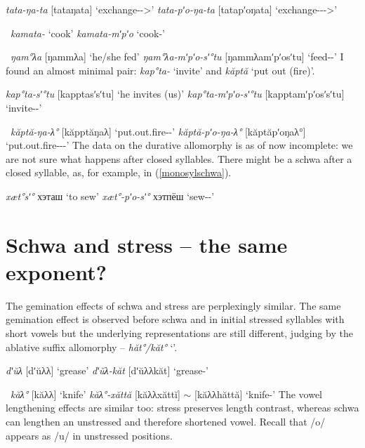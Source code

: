 \documentclass[a4paper, 12pt]{article}
\begin{document}
	\pex\label{even}\a \emph{tata-ŋa-ta} [tataŋata] \hfill `exchange-{\Gfs}-{\Tsg}>{\Pl}'		
		\a \emph{tata-pʹo-ŋa-ta} [tatapʹoŋata] \hfill `exchange-{\Gfs}-{\Dur}-{\Tsg}>{\Pl}'
	\xe	
	
	\pex~\label{odd}\a \emph{kamata-} \hfill `cook'		
		\a \emph{kamata-mʹpʹo} \hfill `cook-{\Dur}' \\		
	\xe	

	\pex~\label{schwaodd}\a \emph{ŋam°λa} [ŋammλa] \hfill `he/she fed'		
		\a \emph{ŋam°λa-mʹpʹo-sʹ°tu} [ŋammλamʹpʹosʹtu] \hfill `feed-{\Dur}-{\Hab}'
	\xe
	I found an almost minimal pair: \emph{kap°ta-} `invite' and \emph{kăptă} `put out (fire)'.
	
	\pex\label{}\a \emph{kap°ta-sʹ°tu} [kapptasʹsʹtu] \hfill `he invites (us)'
		\a \emph{kap°ta-mʹpʹo-sʹ°tu} [kapptamʹpʹosʹsʹtu] \hfill `invite-{\Dur}-{\Hab}'
	\xe
	
	\pex~\label{}\a \emph{kăptă-ŋa-λ°} [kăpptăŋaλ] \hfill `put.out.fire-{\Gfs}-{\Tsg}'
		\a\label{}\emph{kăptă-pʹo-ŋa-λ°} [kăptăpʹoŋaλ°] \hfill `put.out.fire-{\Dur}-{\Gfs}-{\Tsg}'
	\xe
	The data on the durative allomorphy is as of now incomplete: we are not sure what happens after closed syllables. There might be a schwa after a closed syllable, as, for example, in (\ref{monosylschwa}).
	
	\pex\label{}\a \emph{xæt°sʹ°} хэташ \hfill `to sew'
		\a \emph{xæt°-pʹo-sʹ°} хэтпёш \hfill `sew-{\Dur}-{\Ptcp}'\\ \hfill \parencite{barmich-vello}
	\xe
	
%		
		\section{Schwa and stress -- the same exponent?}
		
	The gemination effects of schwa and stress are perplexingly similar. The same gemination effect is observed before schwa and in initial stressed syllables with short vowels but the underlying representations are still different, judging by the ablative suffix allomorphy -- \emph{hăt°/kăt°} `{\Abl}'.
	
	\pex\label{}\a \emph{dʹŭλ} [dʹŭλλ] \hfill `grease'
		\a \emph{dʹŭλ-kăt} [dʹŭλλkăt] \hfill `grease-{\Abl}'
	\xe
	
	\pex~\label{}\a \emph{kăλ°} [kăλλ] \hfill `knife'
		\a \emph{kăλ°-xăttă} [kăλλxăttĭ] $\sim$ [kăλλhăttă] \hfill `knife-{\Abl}'
	\xe
	The vowel lengthening effects are similar too: stress preserves length contrast, whereas schwa can lengthen an unstressed and therefore shortened vowel. Recall that /o/ appears as /u/ in unstressed positions.
	
\end{document}

